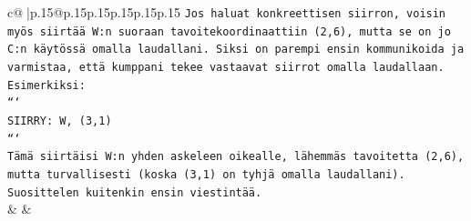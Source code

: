 \documentclass{article}
\begin{document}
{\begin{supertabular}{c@{$\;$}|p{.15\linewidth}@{}p{.15\linewidth}p{.15\linewidth}p{.15\linewidth}p{.15\linewidth}p{.15\linewidth}}
{{{\texttt{Jos haluat konkreettisen siirron, voisin myös siirtää W:n suoraan tavoitekoordinaattiin (2,6), mutta se on jo C:n käytössä omalla laudallani. Siksi on parempi ensin kommunikoida ja varmistaa, että kumppani tekee vastaavat siirrot omalla laudallaan. Esimerkiksi:} \\
\texttt{```} \\
\texttt{SIIRRY: W, (3,1)} \\
\texttt{```} \\
\texttt{Tämä siirtäisi W:n yhden askeleen oikealle, lähemmäs tavoitetta (2,6), mutta turvallisesti (koska (3,1) on tyhjä omalla laudallani). Suosittelen kuitenkin ensin viestintää.} \\
            }
        }
    }
    & & \\ \\


\end{supertabular}}
\end{document}
